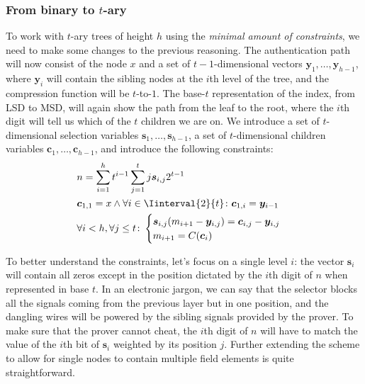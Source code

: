 \subsubsection*{From binary to \(t\)-ary}
To work with \(t\)-ary trees of height \(h\) using the \emph{minimal amount of constraints}, we 
need to make some changes to the previous reasoning.
The authentication path will now consist of the node \(x\) and a set of \(t-1\)-dimensional 
vectors \(\bm{y}_1, \dots, \bm{y}_{h-1}\), where \(\bm{y}_i\) will contain the sibling nodes at 
the \(i\)th level of the tree, and the compression function will be \(t\)-to-\(1\).
The base-\(t\) representation of the index, from LSD to MSD, will again show the path from the leaf 
to the root, where the \(i\)th digit will tell us which of the \(t\) children we are on.
We introduce a set of \(t\)-dimensional selection variables \(\bm{s}_1, \dots, \bm{s}_{h-1}\), a 
set of \(t\)-dimensional children variables \(\bm{c}_1, \dots, \bm{c}_{h-1}\), and introduce 
the following constraints:
\begin{align*}
  & n = \sum_{i=1}^{h}{t^{i-1}\sum_{j=1}^{t}{j\bm{s}_{i,j}2^{t-1}}} \\
  & \bm{c}_{1,1} = x \land \forall i \in \Iinterval{2}{t}\colon \bm{c}_{1,i} = \bm{y}_{i-1} \\
  & \forall i < h, \forall j \le t\colon 
  \begin{cases}
    \bm{s}_{i,j}\Parens*{m_{i+1} - \bm{y}_{i,j}} = \bm{c}_{i,j} - \bm{y}_{i,j} \\
    m_{i+1} = \call{C}{\bm{c}_i}
  \end{cases}
\end{align*}

To better understand the constraints, let's focus on a single level \(i\): the vector 
\(\bm{s}_i\) will contain all zeros except in the position dictated by the \(i\)th digit of 
\(n\) when represented in base \(t\). 
In an electronic jargon, we can say that the selector blocks all the signals coming from the 
previous layer but in one position, and the dangling wires will be powered by the sibling signals 
provided by the prover.
To make sure that the prover cannot cheat, the \(i\)th digit of \(n\) will have to match the 
value of the \(i\)th bit of \(\bm{s}_i\) weighted by its position \(j\).
Further extending the scheme to allow for single nodes to contain multiple field elements is 
quite straightforward.

